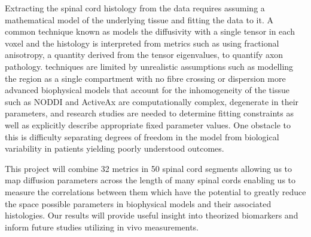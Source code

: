 Extracting the spinal cord histology from the \dmri data requires assuming a mathematical model of the underlying tissue and fitting the data to it. A common technique known as \dti models the diffusivity with a single tensor in each voxel and the histology is interpreted from \dti metrics such as using fractional anisotropy, a quantity derived from the tensor eigenvalues, to quantify axon pathology. \dti techniques are limited by unrealistic assumptions such as modelling the region as a single compartment with no fibre crossing or dispersion \cite{vedantam2014diffusion} more advanced biophysical models that account for the inhomogeneity of the tissue such as NODDI and ActiveAx are computationally complex, degenerate in their parameters, and research studies are needed to determine fitting constraints as well as explicitly describe appropriate fixed parameter values. One obstacle to this is difficulty separating degrees of freedom in the model from biological variability in patients yielding poorly understood outcomes. \cite{novikov2018modeling}

This project will combine 32 metrics in 50 spinal cord segments allowing us to map diffusion parameters across the length of many spinal cords enabling us to measure the correlations between them which have the potential to greatly reduce the space possible parameters in biophysical models and their associated histologies. Our results will provide useful insight into theorized biomarkers and inform future studies utilizing in vivo measurements. 




